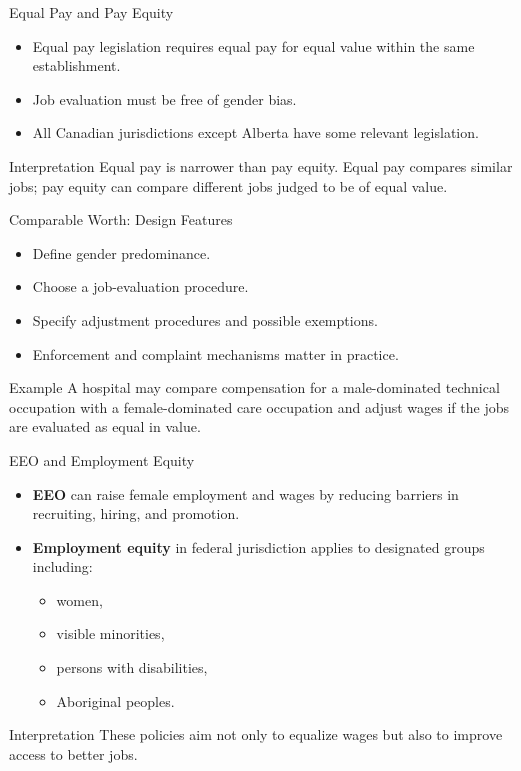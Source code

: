 \documentclass[aspectratio=169]{beamer}
\begin{document}
\begin{frame}{Equal Pay and Pay Equity}
\transfade
\begin{itemize}[<+->]
  \item Equal pay legislation requires equal pay for equal value within the same establishment.
  \item Job evaluation must be free of gender bias.
  \item All Canadian jurisdictions except Alberta have some relevant legislation.
\end{itemize}

\begin{block}{Interpretation}
Equal pay is narrower than pay equity. Equal pay compares similar jobs; pay equity can compare different jobs judged to be of equal value.
\end{block}
\end{frame}

\begin{frame}{Comparable Worth: Design Features}
\transfade
\begin{itemize}[<+->]
  \item Define gender predominance.
  \item Choose a job-evaluation procedure.
  \item Specify adjustment procedures and possible exemptions.
  \item Enforcement and complaint mechanisms matter in practice.
\end{itemize}

\begin{exampleblock}{Example}
A hospital may compare compensation for a male-dominated technical occupation with a female-dominated care occupation and adjust wages if the jobs are evaluated as equal in value.
\end{exampleblock}
\end{frame}

\begin{frame}{EEO and Employment Equity}
\transfade
\begin{itemize}[<+->]
  \item \textbf{EEO} can raise female employment and wages by reducing barriers in recruiting, hiring, and promotion.
  \item \textbf{Employment equity} in federal jurisdiction applies to designated groups including:
  \begin{itemize}[<+->]
    \item women,
    \item visible minorities,
    \item persons with disabilities,
    \item Aboriginal peoples.
  \end{itemize}
\end{itemize}

\begin{block}{Interpretation}
These policies aim not only to equalize wages but also to improve access to better jobs.
\end{block}
\end{frame}
\end{document}
